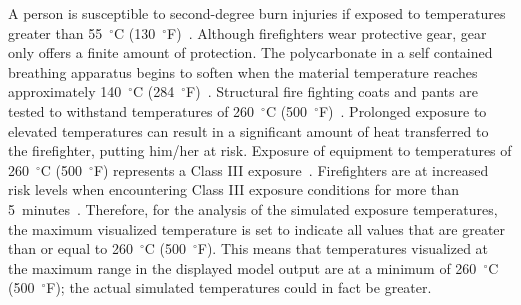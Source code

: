 \documentclass[12pt,oneside]{book}
\begin{document}
A person is susceptible to second-degree burn injuries if exposed to temperatures greater than 55~$^{\circ}$C (130~$^{\circ}$F)~\cite{contactburn}. Although firefighters wear protective gear, gear only offers a finite amount of protection. The polycarbonate in a self contained breathing apparatus begins to soften when the material temperature reaches approximately 140~$^{\circ}$C (284~$^{\circ}$F)~\cite{mensch2011emergency}. Structural fire fighting coats and pants are tested to withstand temperatures of 260~$^{\circ}$C (500~$^{\circ}$F)~\cite{nfpa2013standard}. Prolonged exposure to elevated temperatures can result in a significant amount of heat transferred to the firefighter, putting him/her at risk. Exposure of equipment to temperatures of 260~$^{\circ}$C (500~$^{\circ}$F) represents a Class III exposure~\cite{Donnelly2006}. Firefighters are at increased risk levels when encountering Class III exposure conditions for more than 5~minutes~\cite{Donnelly2006}. Therefore, for the analysis of the simulated exposure temperatures, the maximum visualized temperature is set to indicate all values that are greater than or equal to 260~$^{\circ}$C (500~$^{\circ}$F). This means that temperatures visualized at the maximum range in the displayed model output are at a minimum of 260~$^{\circ}$C (500~$^{\circ}$F); the actual simulated temperatures could in fact be greater. 

\end{document}
